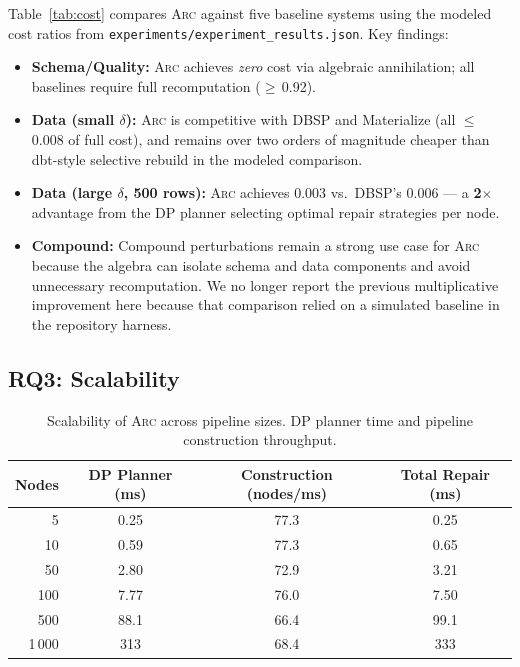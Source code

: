 \documentclass[sigplan,screen,nonacm]{acmart}
\newcommand{\arc}{\textsc{Arc}\xspace}
\begin{document}
Table~\ref{tab:cost} compares \arc against five baseline systems using the
modeled cost ratios from \texttt{experiments/experiment\_results.json}. Key findings:
\begin{itemize}
\item \textbf{Schema/Quality:} \arc achieves \emph{zero} cost via algebraic
  annihilation; all baselines require full recomputation ($\geq$\,0.92).
\item \textbf{Data (small $\delta$):} \arc is competitive with DBSP and
  Materialize (all $\leq$\,0.008 of full cost), and remains over two orders of
  magnitude cheaper than dbt-style selective rebuild in the modeled comparison.
\item \textbf{Data (large $\delta$, 500 rows):} \arc achieves 0.003 vs.\
  DBSP's 0.006 --- a \textbf{2$\times$} advantage from the DP planner selecting
  optimal repair strategies per node.
\item \textbf{Compound:} Compound perturbations remain a strong use case for
  \arc because the algebra can isolate schema and data components and avoid
  unnecessary recomputation. We no longer report the previous multiplicative
  improvement here because that comparison relied on a simulated baseline in
  the repository harness.
\end{itemize}

\subsection{RQ3: Scalability}

\begin{table}[t]
\caption{Scalability of \arc across pipeline sizes.  DP planner time
  and pipeline construction throughput.}
\label{tab:scale}
\centering\small
\begin{tabular}{@{}rccc@{}}
\toprule
\textbf{Nodes} & \textbf{DP Planner (ms)} &
  \textbf{Construction (nodes/ms)} &
  \textbf{Total Repair (ms)} \\
\midrule
5       & 0.25    & 77.3   & 0.25 \\
10      & 0.59    & 77.3   & 0.65 \\
50      & 2.80    & 72.9   & 3.21 \\
100     & 7.77    & 76.0   & 7.50 \\
500     & 88.1    & 66.4   & 99.1 \\
1\,000  & 313     & 68.4   & 333 \\
\bottomrule
\end{tabular}
\end{table}
\end{document}
